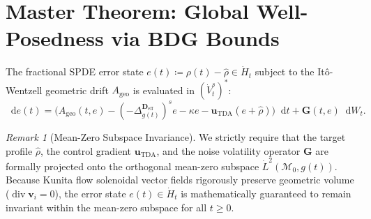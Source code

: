 \documentclass[11pt,a4paper]{article}
\newcommand*{\diff}{\mathop{}\!\mathrm{d}}
\newcommand*{\M}{\mathcal{M}}
\DeclareMathOperator{\divop}{div}
\theoremstyle{plain}
\theoremstyle{definition}
\theoremstyle{remark}
\newtheorem{remark}[theorem]{Remark}
\begin{document}
\section{Master Theorem: Global Well-Posedness via BDG Bounds}
The fractional SPDE error state $e(t) \coloneqq \rho(t) - \hat{\rho} \in \dot{H}_t$ subject to the It\^{o}-Wentzell geometric drift $A_{\mathrm{geo}}$ is evaluated in $(\dot{V}_t^s)^*$:
\begin{equation}
    \diff e(t) = \Big( A_{\mathrm{geo}}(t,e) - (-\Delta_{g(t)}^{\mathbf{D}_{\mathrm{eff}}})^s e - \kappa e - \mathbf{u}_{\mathrm{TDA}}(e + \hat{\rho}) \Big) \diff t + \mathbf{G}(t, e) \diff W_t.
\end{equation}

\begin{remark}[Mean-Zero Subspace Invariance]
We strictly require that the target profile $\hat{\rho}$, the control gradient $\mathbf{u}_{\mathrm{TDA}}$, and the noise volatility operator $\mathbf{G}$ are formally projected onto the orthogonal mean-zero subspace $\dot{L}^2(\M_0, g(t))$. Because Kunita flow solenoidal vector fields rigorously preserve geometric volume ($\divop \mathbf{v}_i = 0$), the error state $e(t) \in \dot{H}_t$ is mathematically guaranteed to remain invariant within the mean-zero subspace for all $t \ge 0$.
\end{remark}
\end{document}

